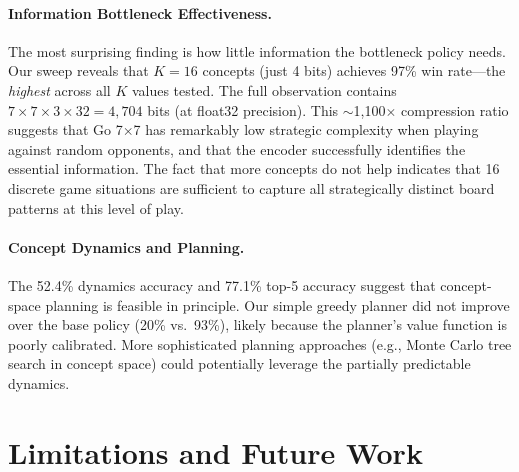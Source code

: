 \documentclass[11pt,a4paper]{article}
\begin{document}
\paragraph{Information Bottleneck Effectiveness.}
The most surprising finding is how little information the bottleneck policy needs. Our sweep reveals that $K=16$ concepts (just 4 bits) achieves 97\% win rate---the \emph{highest} across all $K$ values tested. The full observation contains $7 \times 7 \times 3 \times 32 = 4{,}704$ bits (at float32 precision). This $\sim$1{,}100$\times$ compression ratio suggests that Go 7$\times$7 has remarkably low strategic complexity when playing against random opponents, and that the encoder successfully identifies the essential information. The fact that more concepts do not help indicates that 16 discrete game situations are sufficient to capture all strategically distinct board patterns at this level of play.

\paragraph{Concept Dynamics and Planning.}
The 52.4\% dynamics accuracy and 77.1\% top-5 accuracy suggest that concept-space planning is feasible in principle. Our simple greedy planner did not improve over the base policy (20\% vs.\ 93\%), likely because the planner's value function is poorly calibrated. More sophisticated planning approaches (e.g., Monte Carlo tree search in concept space) could potentially leverage the partially predictable dynamics.

\section{Limitations and Future Work}
\end{document}
